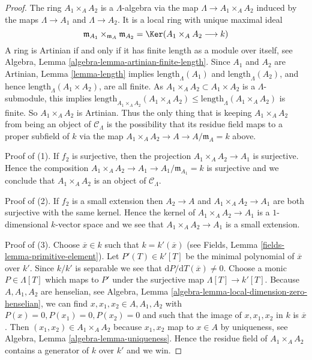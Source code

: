 \begin{proof}
The ring $A_1 \times_A A_2$ is a $\Lambda$-algebra via  the map
$\Lambda \to A_1 \times_A A_2$ induced by the maps
$\Lambda \to A_1$ and $\Lambda \to A_2$. It is a local ring with unique
maximal ideal
$$
\mathfrak m_{A_1} \times_{\mathfrak m_A} \mathfrak m_{A_2} =
\Ker(A_1 \times_A A_2 \longrightarrow k)
$$
A ring is Artinian if and only if it has finite length as a module
over itself, see
Algebra, Lemma \ref{algebra-lemma-artinian-finite-length}.
Since $A_1$ and $A_2$ are Artinian, Lemma \ref{lemma-length} implies
$\text{length}_\Lambda(A_1)$ and $\text{length}_\Lambda(A_2)$,
and hence $\text{length}_\Lambda(A_1 \times A_2)$, are all finite.  As
$A_1 \times_A A_2 \subset A_1 \times A_2$ is a $\Lambda$-submodule, this
implies
$\text{length}_{A_1 \times_A A_2}(A_1 \times_A A_2) \leq
\text{length}_\Lambda(A_1 \times_A A_2)$ is finite. So $A_1
\times_A A_2$ is Artinian. Thus the only thing that is keeping
$A_1 \times_A A_2$ from being an object of $\mathcal{C}_\Lambda$ is
the possibility that its residue field maps to a proper subfield of $k$
via the map $A_1 \times_A A_2 \to A \to A/\mathfrak m_A = k$ above.

\medskip\noindent
Proof of (1). If $f_2$ is surjective, then the projection
$A_1 \times_A A_2 \to A_1$ is surjective. Hence the composition
$A_1 \times_A A_2 \to A_1 \to A_1/\mathfrak m_{A_1} = k$ is surjective
and we conclude that $A_1 \times_A A_2$ is an object of $\mathcal{C}_\Lambda$.

\medskip\noindent
Proof of (2). If $f_2$ is a small extension then $A_2 \to A$ and
$A_1 \times_A A_2  \to A_1$ are both surjective with the same kernel.
Hence the kernel of $A_1 \times_A A_2  \to A_1$ is a $1$-dimensional
$k$-vector space and we see that $A_1 \times_A A_2  \to A_1$ is a small
extension.

\medskip\noindent
Proof of (3). Choose $\overline{x} \in k$ such that
$k = k'(\overline{x})$ (see
Fields, Lemma \ref{fields-lemma-primitive-element}).
Let $P'(T) \in k'[T]$ be the minimal polynomial of $\overline{x}$ over $k'$.
Since $k/k'$ is separable we see that
$\text{d}P/\text{d}T(\overline{x}) \not = 0$.
Choose a monic $P \in \Lambda[T]$ which maps to $P'$ under the surjective map
$\Lambda[T] \to k'[T]$. Because $A, A_1, A_2$ are henselian, see
Algebra, Lemma \ref{algebra-lemma-local-dimension-zero-henselian},
we can find $x, x_1, x_2 \in A, A_1, A_2$ with $P(x) = 0, P(x_1) = 0,
P(x_2) = 0$ and such that the image of $x, x_1, x_2$ in $k$ is $\overline{x}$.
Then $(x_1, x_2) \in A_1 \times_A A_2$ because $x_1, x_2$
map to $x \in A$ by uniqueness, see
Algebra, Lemma \ref{algebra-lemma-uniqueness}.
Hence the residue field of
$A_1 \times_A A_2$ contains a generator of $k$ over $k'$ and we win.
\end{proof}

